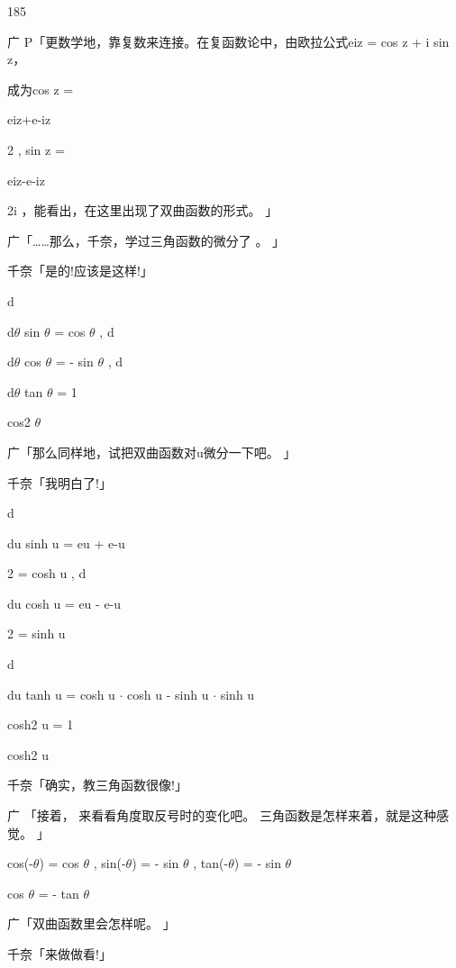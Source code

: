 185\par
广 P「更数学地，靠复数来连接。在复函数论中，由欧拉公式eiz = cos z + i sin z，\par
成为cos z =\par
eiz+e-iz\par
2 , sin z =\par
eiz-e-iz\par
2i ，能看出，在这里出现了双曲函数的形式。 」\par
广「……那么，千奈，学过三角函数的微分了 。 」\par
千奈「是的!应该是这样!」\par
d\par
d$\theta$ sin $\theta$ = cos $\theta$ , d\par
d$\theta$ cos $\theta$ = - sin $\theta$ , d\par
d$\theta$ tan $\theta$ = 1\par
cos2 $\theta$\par
广「那么同样地，试把双曲函数对u微分一下吧。 」\par
千奈「我明白了!」\par
d\par
du sinh u = eu + e-u\par
2 = cosh u , d\par
du cosh u = eu - e-u\par
2 = sinh u\par
d\par
du tanh u = cosh u $\cdot$ cosh u - sinh u $\cdot$ sinh u\par
cosh2 u = 1\par
cosh2 u\par
千奈「确实，教三角函数很像!」\par
广 「接着， 来看看角度取反号时的变化吧。 三角函数是怎样来着，就是这种感觉。 」\par
cos(-$\theta$) = cos $\theta$ , sin(-$\theta$) = - sin $\theta$ , tan(-$\theta$) = - sin $\theta$\par
cos $\theta$ = - tan $\theta$\par
广「双曲函数里会怎样呢。 」\par
千奈「来做做看!」\par

